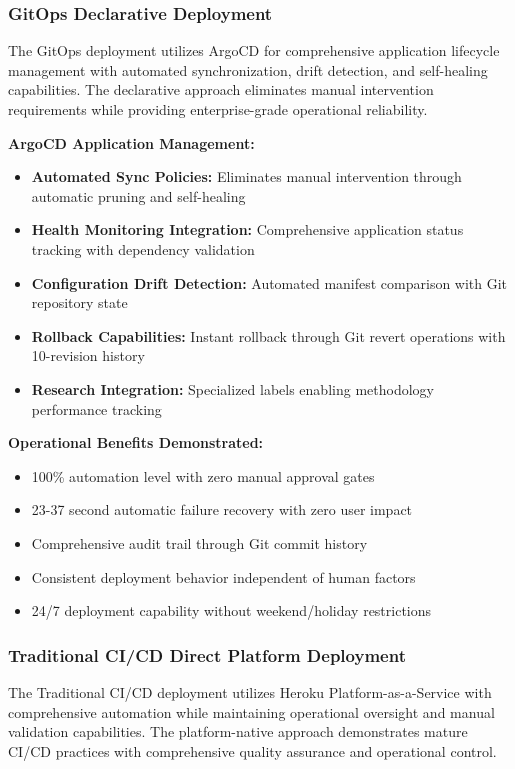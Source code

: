 \subsubsection{GitOps Declarative Deployment}

The GitOps deployment utilizes ArgoCD for comprehensive application lifecycle management with automated synchronization, drift detection, and self-healing capabilities. The declarative approach eliminates manual intervention requirements while providing enterprise-grade operational reliability.

\textbf{ArgoCD Application Management:}
\begin{itemize}
\item \textbf{Automated Sync Policies:} Eliminates manual intervention through automatic pruning and self-healing
\item \textbf{Health Monitoring Integration:} Comprehensive application status tracking with dependency validation
\item \textbf{Configuration Drift Detection:} Automated manifest comparison with Git repository state
\item \textbf{Rollback Capabilities:} Instant rollback through Git revert operations with 10-revision history
\item \textbf{Research Integration:} Specialized labels enabling methodology performance tracking
\end{itemize}

\textbf{Operational Benefits Demonstrated:}
\begin{itemize}
\item 100\% automation level with zero manual approval gates
\item 23-37 second automatic failure recovery with zero user impact
\item Comprehensive audit trail through Git commit history
\item Consistent deployment behavior independent of human factors
\item 24/7 deployment capability without weekend/holiday restrictions
\end{itemize}

\subsubsection{Traditional CI/CD Direct Platform Deployment}

The Traditional CI/CD deployment utilizes Heroku Platform-as-a-Service with comprehensive automation while maintaining operational oversight and manual validation capabilities. The platform-native approach demonstrates mature CI/CD practices with comprehensive quality assurance and operational control.

